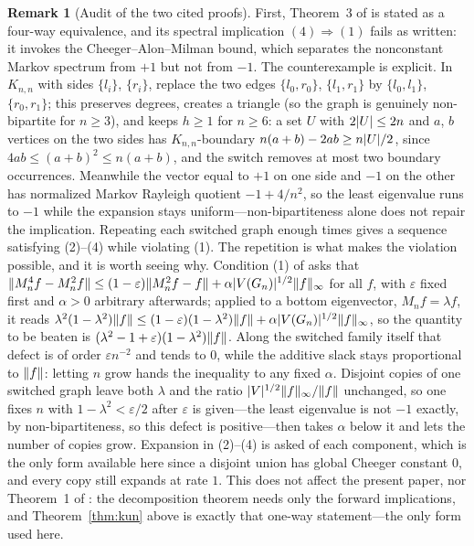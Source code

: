 \documentclass[11pt]{amsart}
\theoremstyle{definition}
\newtheorem{remark}[theorem]{Remark}
\theoremstyle{plain}
\DeclarePairedDelimiter{\abs}{\lvert}{\rvert}
\DeclarePairedDelimiter{\norm}{\lVert}{\rVert}
\begin{document}
\begin{remark}[Audit of the two cited proofs]
First, Theorem~3 of \cite{Kun19} is stated as a four-way equivalence, and its spectral implication \((4)\Rightarrow(1)\) fails as written: it invokes the Cheeger--Alon--Milman bound, which separates the nonconstant Markov spectrum from \(+1\) but not from \(-1\).  The counterexample is explicit.  In \(K_{n,n}\) with sides \(\{l_i\}\), \(\{r_i\}\), replace the two edges \(\{l_0,r_0\}\), \(\{l_1,r_1\}\) by \(\{l_0,l_1\}\), \(\{r_0,r_1\}\); this preserves degrees, creates a triangle (so the graph is genuinely non-bipartite for \(n\geq3\)), and keeps \(h\geq1\) for \(n\geq6\): a set \(U\) with \(2\abs U\leq2n\) and \(a\), \(b\) vertices on the two sides has \(K_{n,n}\)-boundary \(n(a+b)-2ab\geq n\abs U/2\), since \(4ab\leq(a+b)^2\leq n(a+b)\), and the switch removes at most two boundary occurrences.  Meanwhile the vector equal to \(+1\) on one side and \(-1\) on the other has normalized Markov Rayleigh quotient \(-1+4/n^2\), so the least eigenvalue runs to \(-1\) while the expansion stays uniform---non-bipartiteness alone does not repair the implication.  Repeating each switched graph enough times gives a sequence satisfying (2)--(4) while violating (1).  The repetition is what makes the violation possible, and it is worth seeing why.  Condition (1) of \cite[Theorem~3]{Kun19} asks that \(\norm{M_n^4f-M_n^2f}\leq(1-\varepsilon)\norm{M_n^2f-f}+\alpha\abs{V(G_n)}^{1/2}\norm f_\infty\) for all \(f\), with \(\varepsilon\) fixed first and \(\alpha>0\) arbitrary afterwards; applied to a bottom eigenvector, \(M_nf=\lambda f\), it reads \(\lambda^2(1-\lambda^2)\norm f\leq(1-\varepsilon)(1-\lambda^2)\norm f+\alpha\abs{V(G_n)}^{1/2}\norm f_\infty\), so the quantity to be beaten is \((\lambda^2-1+\varepsilon)(1-\lambda^2)\norm f\).  Along the switched family itself that defect is of order \(\varepsilon n^{-2}\) and tends to \(0\), while the additive slack stays proportional to \(\norm f\): letting \(n\) grow hands the inequality to any fixed \(\alpha\).  Disjoint copies of one switched graph leave both \(\lambda\) and the ratio \(\abs{V}^{1/2}\norm f_\infty/\norm f\) unchanged, so one fixes \(n\) with \(1-\lambda^2<\varepsilon/2\) after \(\varepsilon\) is given---the least eigenvalue is not \(-1\) exactly, by non-bipartiteness, so this defect is positive---then takes \(\alpha\) below it and lets the number of copies grow.  Expansion in (2)--(4) is asked of each component, which is the only form available here since a disjoint union has global Cheeger constant \(0\), and every copy still expands at rate \(1\).  This does not affect the present paper, nor Theorem~1 of \cite{Kun19}: the decomposition theorem needs only the forward implications, and Theorem~\ref{thm:kun} above is exactly that one-way statement---the only form used here.


\end{remark}
\end{document}
